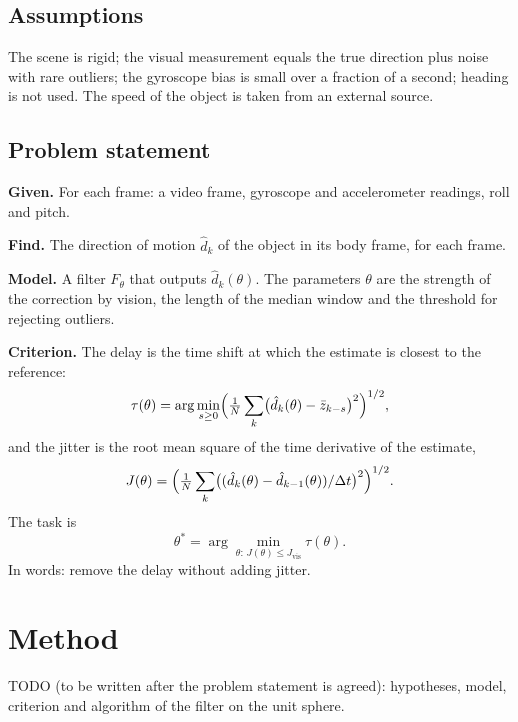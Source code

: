 \documentclass{article}
\begin{document}
\subsection{Assumptions}

The scene is rigid; the visual measurement equals the true direction plus noise with rare outliers; the gyroscope bias is small over a fraction of a second; heading is not used. The speed of the object is taken from an external source.

\subsection{Problem statement}\label{sec:problem}

\textbf{Given.} For each frame: a video frame, gyroscope and accelerometer readings, roll and pitch.

\textbf{Find.} The direction of motion $\hat d_k$ of the object in its body frame, for each frame.

\textbf{Model.} A filter $F_\theta$ that outputs $\hat d_k(\theta)$. The parameters $\theta$ are the strength of the correction by vision, the length of the median window and the threshold for rejecting outliers.

\textbf{Criterion.} The delay is the time shift at which the estimate is closest to the reference:
\begin{equation}\label{eq:delay}
    \tau(\theta) = \arg\min_{s \ge 0} \Bigl( \tfrac{1}{N} \sum_{k} \bigl(\hat d_k(\theta) - \bar z_{k-s}\bigr)^2 \Bigr)^{1/2},
\end{equation}
and the jitter is the root mean square of the time derivative of the estimate,
\begin{equation}\label{eq:jitter}
    J(\theta) = \Bigl( \tfrac{1}{N} \sum_{k} \bigl( (\hat d_k(\theta) - \hat d_{k-1}(\theta)) / \Delta t \bigr)^2 \Bigr)^{1/2}.
\end{equation}
The task is
\begin{equation}\label{eq:argmin}
    \theta^* = \arg\min_{\theta:\, J(\theta) \le J_{\mathrm{vis}}} \tau(\theta).
\end{equation}
In words: remove the delay without adding jitter.

\section{Method}\label{sec:method}

TODO (to be written after the problem statement is agreed): hypotheses, model, criterion and algorithm of the filter on the unit sphere.
\end{document}
